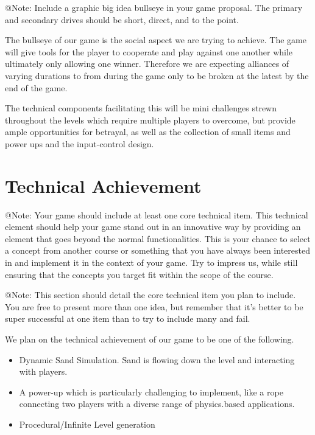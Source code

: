 \begin{TempText}
	@Note: Include a graphic big idea bullseye in your game proposal. The primary and secondary drives should be short, direct, and to the point.
\end{TempText}

The bullseye of our game is the social aspect we are trying to achieve. The game will give tools for the player to cooperate and play against one another while ultimately only allowing one winner. Therefore we are expecting alliances of varying durations to from during the game only to be broken at the latest by the end of the game.

The technical components facilitating this will be mini challenges strewn throughout the levels which require multiple players to overcome, but provide ample opportunities for betrayal, as well as the collection of small items and power ups and the input-control design.


\section{Technical Achievement}

\begin{TempText}
	@Note: Your game should include at least one core technical item. This technical element should help your game stand out in an innovative way by providing an element that goes beyond the normal functionalities. This is your chance to select a concept from another course or something that you have always been interested in and implement it in the context of your game. Try to impress us, while still ensuring that the concepts you target fit within the scope of the course.
\end{TempText}

\begin{TempText}
	@Note: This section should detail the core technical item you plan to include. You are free to present more than one idea, but remember that it's better to be super successful at one item than to try to include many and fail.
\end{TempText}

We plan on the technical achievement of our game to be one of the following.

\begin{itemize}
    \item Dynamic Sand Simulation. Sand is flowing down the level and interacting with players.
    \item A power-up which is particularly challenging to implement, like a rope connecting two players with a diverse range of physics.based applications.
    \item Procedural/Infinite Level generation
\end{itemize}

